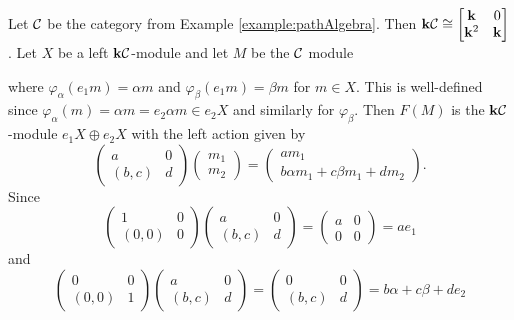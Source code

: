 \begin{example}
    Let $\mathcal{C}$ be the category from Example \ref{example:pathAlgebra}.
    Then $\mathbf{k}\mathcal{C}\cong\begin{bmatrix}
        \mathbf{k}&0\\
        \mathbf{k}^2&\mathbf{k}
    \end{bmatrix}$.
    Let $X$ be a left $\mathbf{k}\mathcal{C}$-module and let $M$ be the $\mathcal{C}$ module
    where $\varphi_\alpha(e_1 m)=\alpha m$ and $\varphi_\beta(e_1 m)=\beta m$ for $m\in X$.
    This is well-defined since $\varphi_\alpha(m)=\alpha m=e_2\alpha m\in e_2 X$ and similarly for $\varphi_\beta$.
    Then $F(M)$ is the $\mathbf{k}\mathcal{C}$-module $e_1X\oplus e_2X$ with the left action given by
    \[ \begin{pmatrix}
        a&0\\
        (b,c)& d
    \end{pmatrix}\begin{pmatrix}
        m_1\\m_2
    \end{pmatrix}=\begin{pmatrix}
        am_1\\
        b \alpha m_1+c \beta m_1+dm_2
    \end{pmatrix}. \]
    Since
    \[ \begin{pmatrix}
        1&0\\(0,0)&0
    \end{pmatrix}\begin{pmatrix}
        a&0\\(b,c)&d
    \end{pmatrix}=\begin{pmatrix}
        a&0\\0&0
    \end{pmatrix}=ae_1 \]
    and
    \[ \begin{pmatrix}
        0&0\\(0,0)&1
    \end{pmatrix}\begin{pmatrix}
        a&0\\(b,c)&d
    \end{pmatrix}=\begin{pmatrix}
        0&0\\(b,c)&d
    \end{pmatrix}=b\alpha+c\beta+de_2 \]

\end{example}

